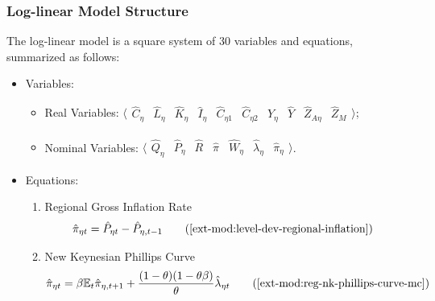 \documentclass[../thesis.tex]{subfiles}
\begin{document}
\newpage


\subsubsection{Log-linear Model Structure}

The log-linear model is a square system of 30 variables and equations, summarized as follows:

{\singlespacing
	
	\begin{itemize}
		
		\item Variables:
		
		\begin{itemize}
			
			\item Real Variables: $\langle \begin{matrix} \hat{C}_{\eta } & \hat{L}_{\eta } & \hat{K}_{\eta} & \hat{I}_{\eta} & \hat{C}_{\eta 1} & \hat{C}_{\eta 2} & \hat{Y}_{\eta } & \hat{Y}_{} & \hat{Z}_{A\eta } & \hat{Z}_{M} \end{matrix} \rangle$;
			
			\item Nominal Variables: $\langle \begin{matrix} \hat{Q}_{\eta} & \hat{P}_{\eta } & \hat{R}_{} & \hat{\pi}_{} & \hat{W}_{\eta } & \hat{\lambda}_{\eta } & \hat{\pi}_{\eta } \end{matrix} \rangle$.
			
		\end{itemize}
		
		\item Equations:
		
		\begin{enumerate}
			
			\item Regional Gross Inflation Rate
			\begin{align}
				\hat{\pi}_{\eta t} &= \hat{P}_{\eta t} - \hat{P}_{\eta, t-1} \tag{\ref{ext-mod:level-dev-regional-inflation}}
			\end{align}
			
			\item New Keynesian Phillips Curve
			\begin{align}
				\hat{\pi}_{\eta t} &= \beta \E \hat{\pi}_{\eta, t+1} + \frac{(1-\theta) (1- \theta \beta)}{\theta} \hat{\lambda}_{\eta t} \tag{\ref{ext-mod:reg-nk-phillips-curve-mc}}
			\end{align}
			

\end{enumerate}
\end{itemize}}
\end{document}
